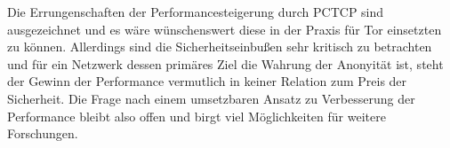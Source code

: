 \documentclass[fleqn,envcountsame,runningheads,10pt,a4paper]{llncs}
\begin{document}
Die Errungenschaften der Performancesteigerung durch PCTCP sind ausgezeichnet und es wäre wünschenswert diese in der Praxis für Tor einsetzten zu können. Allerdings sind die Sicherheitseinbußen sehr kritisch zu betrachten und für ein Netzwerk dessen primäres Ziel die Wahrung der Anonyität ist, steht der Gewinn der Performance vermutlich in keiner Relation zum Preis der Sicherheit. Die Frage nach einem umsetzbaren Ansatz zu Verbesserung der Performance bleibt also offen und birgt viel Möglichkeiten für weitere Forschungen.










\end{document}
